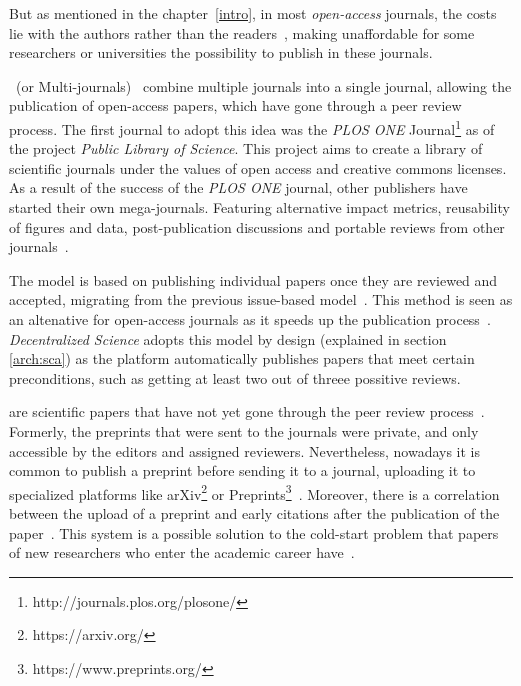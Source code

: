 But as mentioned in the chapter~\ref{intro}, in most \emph{open-access}
journals, the costs lie with the authors rather than the
readers~\cite{lariviere2015oligopoly,van2013true}, making unaffordable for some
researchers or universities the possibility to publish in these journals.

~(or Multi-journals)~\cite{binfield2013open,wellen2013open}
combine multiple journals into a single journal, allowing the publication of
open-access papers, which have gone through a peer review process. The first
journal to adopt this idea was the \emph{PLOS ONE}
Journal\footnote{http://journals.plos.org/plosone/} as of the project
\emph{Public Library of Science}. This project aims to create a library of
scientific journals under the values of open access and creative commons
licenses. As a result of the success of the \emph{PLOS ONE} journal, other
publishers have started their own mega-journals. Featuring alternative impact
metrics, reusability of figures and data, post-publication discussions and
portable reviews from other journals~\cite{bjork2015have}.

The  model is based on publishing individual papers
once they are reviewed and accepted, migrating from the previous issue-based
model~\cite{anderton2013continuous}. This method is seen as an altenative for
open-access journals as it speeds up the publication process~\cite{haymanview}.
\emph{Decentralized Science} adopts this model by design (explained in section
\ref{arch:sca}) as the platform automatically publishes papers that meet certain
preconditions, such as getting at least two out of threee possitive reviews.

 are scientific papers that have not yet gone through the peer
review process~\cite{harnad2003electronic}. Formerly, the preprints that were
sent to the journals were private, and only accessible by the editors and
assigned reviewers. Nevertheless, nowadays it is common to publish a preprint
before sending it to a journal, uploading it to specialized platforms like
arXiv\footnote{https://arxiv.org/} or
Preprints\footnote{https://www.preprints.org/}~\cite{brown2001volution}.
Moreover, there is a correlation between the upload of a preprint and early
citations after the publication of the paper~\cite{shuai2012scientific}. This
system is a possible solution to the cold-start problem that papers of new
researchers who enter the academic career have~\cite{sugiyama2010scholarly}.

